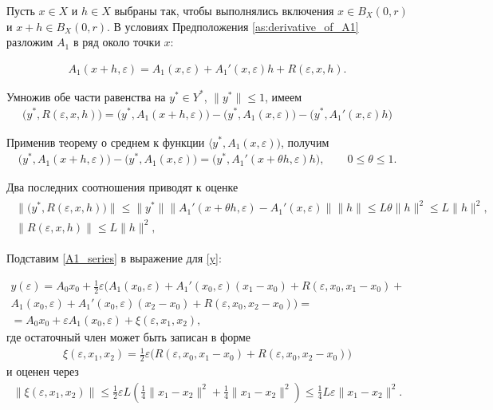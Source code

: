 \documentclass[../main.tex]{subfiles}
\begin{document}
Пусть $x \in X$ и $h \in X$ выбраны так, чтобы выполнялись включения $x\in B_X(0, r)$ и $x+h \in B_X(0, r)$.
В условиях Предположения \ref{as:derivative_of_A1} разложим $A_1$ в ряд около точки $x$:

\begin{gather}\label{A1_series}
 A_1(x + h,\varepsilon) = A_1(x,\varepsilon) + A_1'(x,\varepsilon) h + R(\varepsilon, x, h).
\end{gather}

Умножив обе части равенства на $y^* \in Y^*$, $\|y^*\| \leqslant 1$, имеем
\begin{gather*}
\big( y^*, R(\varepsilon, x, h)\big) = 
\big( y^*, A_1(x + h,\varepsilon)\big) -
\big( y^*, A_1(x,\varepsilon)\big) -
\big( y^*, A_1'(x,\varepsilon) h\big)
\end{gather*}

Применив теорему о среднем к функции $\langle y^*, A_1(x,\varepsilon)\big)$, получим
\begin{gather*}
\big( y^*, A_1(x + h,\varepsilon)\big) -
\big( y^*, A_1(x,\varepsilon)\big) = 
\big( y^*, A_1'(x + \theta h,\varepsilon) h\big),
 \qquad
 0 \leqslant \theta \leqslant 1.
\end{gather*}

Два последних соотношения приводят к оценке
\begin{gather}
 \begin{gathered}
 \|\big( y^*, R(\varepsilon, x, h)\big) \| \leqslant
 \| y^* \| 
 \| A_1'(x + \theta h,\varepsilon) -
 A_1'(x,\varepsilon) \| 
 \| h \| \leqslant 
 L \theta \|h\|^2 \leqslant
 L \|h\|^2, \\
 \| R(\varepsilon, x, h) \| \leqslant
 L \|h\|^2, 
 \end{gathered}
\end{gather}

Подставим \eqref{A1_series} в выражение для \eqref{y}:

\begin{gather*}
 y(\varepsilon) =
 A_0x_0 +
 \frac{1}{2}\varepsilon \Big(
 A_1(x_0,\varepsilon) +
 A_1'(x_0,\varepsilon)(x_1 - x_0)+ 
 R(\varepsilon, x_0, x_1 - x_0) + \\ 
 A_1(x_0,\varepsilon) +
 A_1'(x_0,\varepsilon)(x_2 - x_0)+ 
 R(\varepsilon, x_0, x_2 - x_0)
 \Big) = \\ = 
 A_0x_0 + 
 \varepsilon A_1(x_0,\varepsilon) +
 \xi(\varepsilon,x_1,x_2),
\end{gather*}
где остаточный член может быть записан в форме
\begin{gather*}
 \xi(\varepsilon,x_1,x_2) = \frac{1}{2}\varepsilon\big(R(\varepsilon, x_0, x_1 - x_0) + R(\varepsilon, x_0, x_2 - x_0)\big)
\end{gather*}
и оценен через
\begin{gather*}
 \|\xi(\varepsilon,x_1,x_2)\| \leqslant \frac{1}{2}\varepsilon L \left(\frac{1}{4}\|x_1 - x_2\|^2 + \frac{1}{4}\|x_1 - x_2\|^2 \right) \leqslant \frac{1}{4}L\varepsilon\|x_1 - x_2\|^2. 
\end{gather*}
\end{document}
